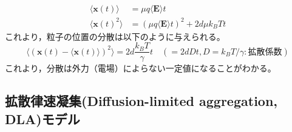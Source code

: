 \documentclass[autodetect-engine,dvi=dvipdfmx,a4paper,ja=standard,oneside,openany,11pt,draft,textwidth=50zw]{bxjsbook}
\begin{document}
\begin{equation}
  \begin{split}
    \langle\bm{x}(t)\rangle   & =\mu q\langle\bm{E}\rangle t                    \\
    \langle\bm{x}(t)^2\rangle & =(\mu q \langle\bm{E}\rangle t)^2+2d\mu k_B T t
  \end{split}
  \label{eq:Langevin_overdamped_average}
\end{equation}
これより，粒子の位置の分散は以下のように与えられる。
\begin{equation}
  \langle(\bm{x}(t)-\langle\bm{x}(t)\rangle)^2\rangle=2d \frac{k_B T}{\gamma} t \quad (=2d D t, D=k_B T/\gamma:\mathrm{拡散係数})
  \label{eq:Langevin_overdamped_variance}
\end{equation}
これより，分散は外力（電場）によらない一定値になることがわかる。

\subsection{拡散律速凝集(Diffusion-limited aggregation, DLA)モデル}

\ifdraft{
  
  
}{}
\end{document}
